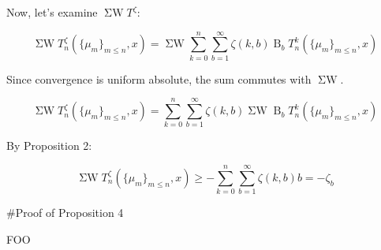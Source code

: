 \documentclass[a4paper]{article}
\newcommand{\B}{\operatorname{B}_b}
\newcommand{\SW}{\operatorname{\Sigma W}}
\begin{document}
Now, let's examine ${\SW T^\zeta}$:

$$\SW T^\zeta_n(\{\mu_m \}_{m \leq n},x)=\SW \sum_{k=0}^n \sum_{b=1}^\infty \zeta(k,b) \B T^k_n(\{\mu_m \}_{m \leq n},x)$$

Since convergence is uniform absolute, the sum commutes with ${\SW}$.

$$\SW T^\zeta_n(\{\mu_m \}_{m \leq n},x)=\sum_{k=0}^n \sum_{b=1}^\infty \zeta(k,b) \SW \B T^k_n(\{\mu_m \}_{m \leq n},x)$$

By Proposition 2:


$$\SW T^\zeta_n(\{\mu_m \}_{m \leq n},x)\geq -\sum_{k=0}^n \sum_{b=1}^\infty \zeta(k,b)b = -\zeta_b$$

\#Proof of Proposition 4

FOO
\end{document}
